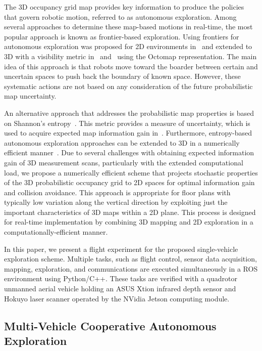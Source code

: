 \documentclass[smallextended]{svjour3}       %
\begin{document}
The 3D occupancy grid map provides key information to produce the policies that govern robotic motion, referred to as autonomous exploration. Among several approaches to determine these map-based motions in real-time, the most popular approach is known as frontier-based exploration. Using frontiers for autonomous exploration was proposed for 2D environments in~\cite{Yam97,Yam98} and extended to 3D with a visibility metric in~\cite{SawKriSri09} and~\cite{ZhuDinLinWu15,SenWan16,KleDor13} using the Octomap representation. The main idea of this approach is that robots move toward the boarder between certain and uncertain spaces to push back the boundary of known space. However, these systematic actions are not based on any consideration of the future probabilistic map uncertainty.

An alternative approach that addresses the probabilistic map properties is based on Shannon's entropy~\cite{StaGriBur05}. This metric provides a measure of uncertainty, which is used to acquire expected map information gain in~\cite{KauAiLee16,KauTakAiLee17}. Furthermore, entropy-based autonomous exploration approaches can be extended to 3D in a numerically efficient manner~\cite{KauTakAiLee18}. Due to several challenges with obtaining expected information gain of 3D measurement scans, particularly with the extended computational load, we propose a numerically efficient scheme that projects stochastic properties of the 3D probabilistic occupancy grid to 2D spaces for optimal information gain and collision avoidance. This approach is appropriate for floor plans with typically low variation along the vertical direction by exploiting just the important characteristics of 3D maps within a 2D plane. This process is designed for real-time implementation by combining 3D mapping and 2D exploration in a computationally-efficient manner.

In this paper, we present a flight experiment for the proposed single-vehicle exploration scheme. Multiple tasks, such as flight control, sensor data acquisition, mapping, exploration, and communications are executed simultaneously in a ROS environment using Python/C++. These tasks are verified with a quadrotor unmanned aerial vehicle holding an ASUS Xtion infrared depth sensor and Hokuyo laser scanner operated by the NVidia Jetson computing module. 


\subsection{Multi-Vehicle Cooperative Autonomous Exploration}
\end{document}
